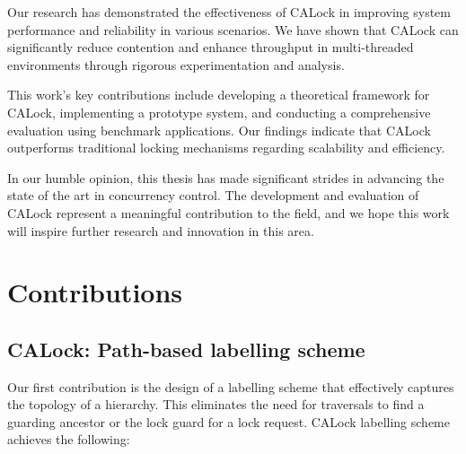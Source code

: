 Our research has demonstrated the effectiveness of CALock in improving system performance and reliability in various scenarios. We have shown that CALock can significantly reduce contention and enhance throughput in multi-threaded environments through rigorous experimentation and analysis.

This work's key contributions include developing a theoretical framework for CALock, implementing a prototype system, and conducting a comprehensive evaluation using benchmark applications. Our findings indicate that CALock outperforms traditional locking mechanisms regarding scalability and efficiency.


In our humble opinion, this thesis has made significant strides in advancing the state of the art in concurrency control. The development and evaluation of CALock represent a meaningful contribution to the field, and we hope this work will inspire further research and innovation in this area.
\section{Contributions}

\subsection{CALock: Path-based labelling scheme}
Our first contribution is the design of a labelling scheme that effectively captures the topology of a hierarchy. This eliminates the need for traversals to find a guarding ancestor or the lock guard for a lock request. CALock labelling scheme achieves the following: 

